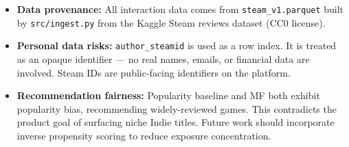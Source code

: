 \documentclass[11pt,a4paper]{article}
\begin{document}
\begin{itemize}[leftmargin=*]
  \item \textbf{Data provenance:} All interaction data comes from \texttt{steam\_v1.parquet} built by \texttt{src/ingest.py} from the Kaggle Steam reviews dataset (CC0 license).
  \item \textbf{Personal data risks:} \texttt{author\_steamid} is used as a row index. It is treated as an opaque identifier --- no real names, emails, or financial data are involved. Steam IDs are public-facing identifiers on the platform.
  \item \textbf{Recommendation fairness:} Popularity baseline and MF both exhibit popularity bias, recommending widely-reviewed games. This contradicts the product goal of surfacing niche Indie titles. Future work should incorporate inverse propensity scoring to reduce exposure concentration.
\end{itemize}
\end{document}
